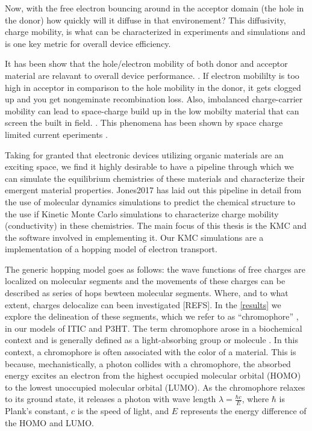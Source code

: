  Now, with the free electron bouncing around in the acceptor domain (the hole in the donor) how
quickly will it diffuse in that environement? This diffusivity, charge mobility, is what can be characterized in experiments and simulations and is one key metric for overall device efficiency.

It has been show that the hole/electron mobility of both donor and acceptor material are
relavant to overall device performance. \cite{Wang2019e}. If electron mobililty is too high
in acceptor  in comparison to the hole mobility in the donor, it gets clogged up and you get 
nongeminate recombination loss.
Also, imbalanced charge-carrier mobility can lead to space-charge build up in the low mobilty material that
can screen the built in field.  \cite{Bartelt2015}. 
This phenomena has been shown by space charge limited current eperiments \cite{Small2013}.

Taking for granted that electronic devices utilizing organic materials are an exciting
space, we find it highly desirable to have a pipeline through which we can simulate the equilibrium
chemistries of these materials and characterize their emergent material properties. Jones2017 has laid out this
pipeline in detail from the use of molecular dynamics simulations to predict the chemical structure to the use
if Kinetic Monte Carlo simulations to characterize charge mobility (conductivity) in these chemistries. The
main focus of this thesis is the KMC and the software involved in emplementing it. Our KMC simulations are a
implementation of a hopping model of electron transport.

The generic hopping model goes as follows: the wave functions of
free charges are localized on molecular segments and the movements of these charges can be described as series
of hops bewteen molecular segments. Where, and to what extent, charges delocalize can been investigated
[REFS]. In the \autoref{results} we explore the delineation of these segments, which we refer to as
``chromophore'' , in our models of ITIC and P3HT. 
The term chromophore arose in a biochemical context and is generally defined
as a light-absorbing group or molecule \cite{biochemistry}.
In this context, a chromophore is often associated with the color of a material.
This is because, mechanistically, a photon collides with a chromophore, the absorbed energy
excites an electron from the highest occupied molecular orbital (HOMO) to the
lowest unoccupied molecular orbital (LUMO). As the chromophore relaxes to its
ground state, it releases a photon with wave length $\lambda = \frac{\hbar c}{E}$,
where $\hbar$ is Plank's constant, $c$ is the speed of light, and $E$ represents the
energy difference of the HOMO and LUMO. 

